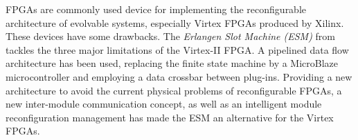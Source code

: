 \label{sec:erlangen}
FPGAs are commonly used device for implementing the reconfigurable architecture of evolvable systems, especially Virtex FPGAs produced by Xilinx. These devices have some drawbacks. The \emph{Erlangen Slot Machine (ESM)} from \cite{erlangen} tackles the three major limitations of the Virtex-II FPGA. A pipelined data flow architecture has been used, replacing the finite state machine by a MicroBlaze microcontroller and employing a data crossbar between plug-ins. Providing a new architecture to avoid the current physical problems of reconfigurable FPGAs, a new inter-module communication concept, as well as an intelligent module reconfiguration management has made the ESM an alternative for the Virtex FPGAs.
